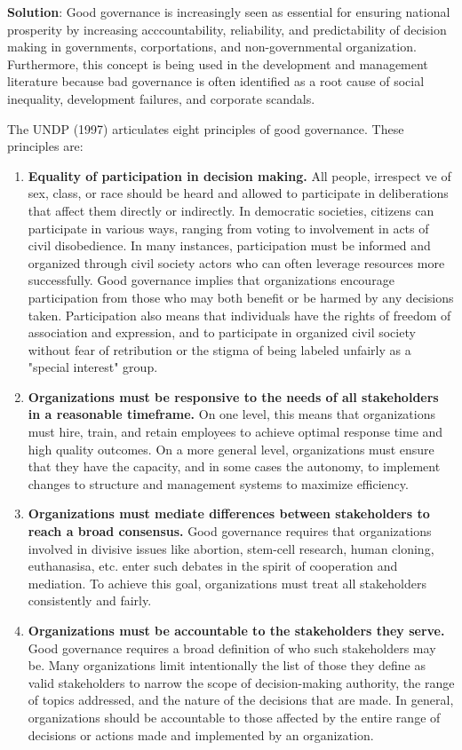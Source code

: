 \documentclass[
]{book}
\newenvironment{solution}{ {\bfseries Solution}:}{}
\begin{document}
\begin{questions}
\begin{solution}
Good governance is increasingly seen as essential for ensuring national prosperity by increasing acccountability, reliability, and predictability of decision making in governments, corportations, and non-governmental organization. Furthermore, this concept is being used in the development and management literature because bad governance is often identified as a root cause of social inequality, development failures, and corporate scandals.

The UNDP (1997) articulates eight principles of good governance. These principles are:

\begin{enumerate}
\item \textbf{Equality of participation in decision making.} All people, irrespect ve of sex, class, or race should be heard and allowed to participate in deliberations that affect them directly or indirectly. In democratic societies, citizens can participate in various ways, ranging from voting to involvement in acts of civil disobedience. In many instances, participation must be informed and organized through civil society actors who can often leverage resources more successfully. Good governance implies that organizations encourage participation from those who may both benefit or be harmed by any decisions taken. Participation also means that individuals have the rights of freedom of association and expression, and to participate in organized civil society without fear of retribution or the stigma of being labeled unfairly as a "special interest" group.
\item \textbf{Organizations must be responsive to the needs of all stakeholders in a reasonable timeframe.} On one level, this means that organizations must hire, train, and retain employees to achieve optimal response time and high quality outcomes. On a more general level, organizations must ensure that they have the capacity, and in some cases the autonomy, to implement changes to structure and management systems to maximize efficiency.
\item \textbf{Organizations must mediate differences between stakeholders to reach a broad consensus.} Good governance requires that organizations involved in divisive issues like abortion, stem-cell research, human cloning, euthanasisa, etc. enter such debates in the spirit of cooperation and mediation. To achieve this goal, organizations must treat all stakeholders consistently and fairly.
\item \textbf{Organizations must be accountable to the stakeholders they serve.} Good governance requires a broad definition of who such stakeholders may be. Many organizations limit intentionally the list of those they define as valid stakeholders to narrow the scope of decision-making authority, the range of topics addressed, and the nature of the decisions that are made. In general, organizations should be accountable to those affected by the entire range of decisions or actions made and implemented by an organization.

\end{enumerate}
\end{solution}
\end{questions}
\end{document}
